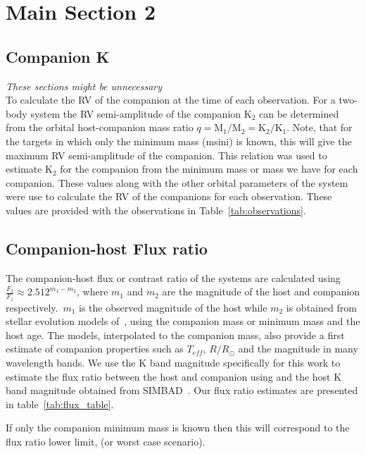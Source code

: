 \section{Main Section 2}



\subsection{Companion K}
\label{sec:companion_RV}
\emph{These sections might be unnecessary}\\

To calculate the RV of the companion at the time of each observation. For a two-body system the RV semi-amplitude of the companion $\textrm{K}_{2}$ can be determined from the orbital host-companion mass ratio $q = \textrm{M}_{1}/\textrm{M}_{2} = \textrm{K}_{2}/\textrm{K}_{1}$.
Note, that for the targets in which only the minimum mass (msini) is known, this will give the maximum RV semi-amplitude of the companion.
This relation was used to estimate $\textrm{K}_2$ for the companion from the minimum mass or mass we have for each companion. These values along with the other orbital parameters of the system were use to calculate the RV of the companions for each observation. These values are provided with the observations in Table~\ref{tab:observations}.


\subsection{Companion-host Flux ratio}
The companion-host flux or contrast ratio of the systems are calculated using $ \frac{F_{2}}{F_{1}} \approx 2.512^{m_1-m_2} $, where $m_1$ and $m_2$ are the magnitude of the host and companion respectively.\ $m_1$ is the observed magnitude of the host while $m_2$ is obtained from stellar evolution models of~\citet{baraffe_evolutionary_2003, baraffe_new_2015}, using the companion mass or minimum mass and the host age. The models, interpolated to the companion mass, also provide a first estimate of companion properties such as $T_{eff}$, $R/R_{\odot}$ and the magnitude in many wavelength bands.
We use the K band magnitude specifically for this work to estimate the flux ratio between the host and companion using and the host K band magnitude obtained from SIMBAD~\citep{wenger_simbad_2000}. Our flux ratio estimates are presented in table~\ref{tab:flux_table}.

If only the companion minimum mass is known then this will correspond to the flux ratio lower limit, (or worst case scenario).


